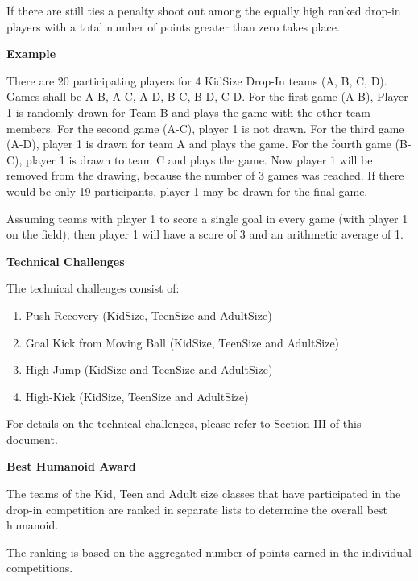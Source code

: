 If there are still ties a penalty shoot out among the equally high ranked drop-in players with a total number of points greater than zero takes place.

\bigskip 
 
{\bfseries Example}
 
There are 20 participating players for 4 KidSize Drop-In teams (A, B, C, D). Games shall be A-B, A-C, A-D, B-C, B-D, C-D. For the first game (A-B), Player 1 is randomly drawn for Team B and plays the game with the other team members. For the second game (A-C), player 1 is not drawn. For the third game (A-D), player 1 is drawn for team A and plays the game. For the fourth game (B-C), player 1 is drawn to team C and plays the game. Now player 1 will be removed from the drawing, because the number of 3 games was reached. If there would be only 19 participants, player 1 may be drawn for the final game.

Assuming teams with player 1 to score a single goal in every game (with player 1 on the field), then player 1 will have a score of 3 and an arithmetic average of 1.

\bigskip

{\bfseries Technical Challenges}

\headlinebox

The technical challenges consist of:

\begin{enumerate}
\item Push Recovery (KidSize, TeenSize and AdultSize)
\item Goal Kick from Moving Ball (KidSize, TeenSize and AdultSize)
\item High Jump (KidSize and TeenSize and AdultSize)
\item High-Kick (KidSize, TeenSize and AdultSize)
\end{enumerate}

For details on the technical challenges, please refer to Section III of this document.

\bigskip

\newpage
{\bfseries Best Humanoid Award}

\headlinebox
 
The teams of the Kid, Teen and Adult size classes that have participated in the drop-in competition are ranked in separate lists to determine the overall best humanoid.

The ranking is based on the aggregated number of points earned in the individual competitions.

